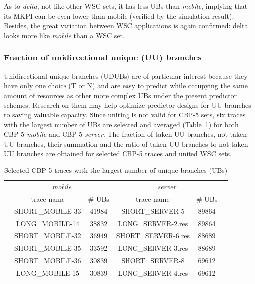 As to \textit{delta}, not like other WSC sets, it has less UBs than \textit{mobile}, implying that its MKPI can be even lower than mobile (verified by the simulation result). Besides, the great variation between WSC applications is again confirmed: delta looks more like \textit{mobile} than a WSC set.


\subsubsection{Fraction of unidirectional unique (UU) branches}

Unidirectional unique branches (UDUBs) are of particular interest because they have only one choice (T or N) and are easy to predict while occupying the same amount of resources as other more complex UBs under the present predictor schemes. Research on them may help optimize predictor designs for UU branches to saving valuable capacity. Since uniting is not valid for CBP-5 sets, six traces with the largest number of UBs are selected and averaged (Table~\ref{table:selected CBP-5}) for both CBP-5 \textit{mobile} and CBP-5 \textit{server}. The fraction of taken UU branches, not-taken UU branches, their summation and the ratio of taken UU branches to not-taken UU branches are obtained for selected CBP-5 traces and united WSC sets.

\begin{table}[h!] 
\vskip 0.2in
\centering
\begin{tabular}{c c c c c c}
\toprule{\LARGE}
\multirow{2}{*}{} & \multicolumn{2}{c}{\textit{mobile}} & \multicolumn{2}{c}{\textit{server}} &\\ 
\cmidrule(l{3pt}r{3pt}){2-3} \cmidrule(l{3pt}r{3pt}){4-5}
&trace name & \# UBs & trace name & \# UBs  \\ 
\midrule
&SHORT\_MOBILE-33 & 41984 & SHORT\_SERVER-5 & 89864\\
&LONG\_MOBILE-14 & 38832 & LONG\_SERVER-2.res & 89864\\
&SHORT\_MOBILE-32 & 36949 & SHORT\_SERVER-6.res & 88689\\
&SHORT\_MOBILE-35 & 33592 & LONG\_SERVER-3.res & 88689\\
&SHORT\_MOBILE-36 & 30839 & SHORT\_SERVER-8 & 69612\\
&LONG\_MOBILE-15 & 30839 & LONG\_SERVER-4.res & 69612\\
\bottomrule
\end{tabular}
\caption{\centering \small Selected CBP-5 traces with the largest number of unique branches (UBs)}
\label{table:selected CBP-5}
\end{table} %


